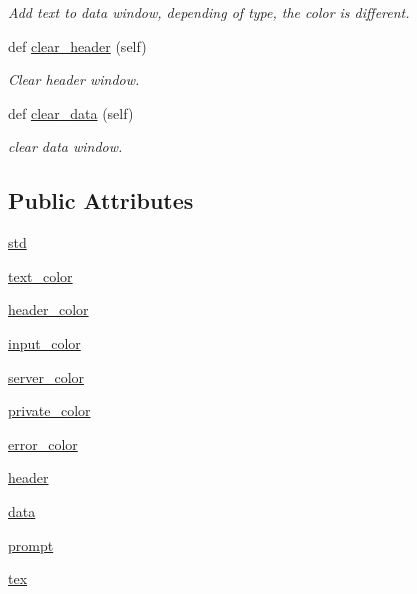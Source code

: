 \begin{DoxyCompactItemize}
\begin{DoxyCompactList}\small\item\em Add text to data window, depending of type, the color is different. \end{DoxyCompactList}\item 
def \hyperlink{classlib_1_1window_1_1_window_a6b69f59f1e8e67522985a37b34aab6e3}{clear\+\_\+header} (self)
\begin{DoxyCompactList}\small\item\em Clear header window. \end{DoxyCompactList}\item 
def \hyperlink{classlib_1_1window_1_1_window_a48311c44458288f29ec758cffa93f801}{clear\+\_\+data} (self)
\begin{DoxyCompactList}\small\item\em clear data window. \end{DoxyCompactList}\end{DoxyCompactItemize}
\subsection*{Public Attributes}
\begin{DoxyCompactItemize}
\item 
\hyperlink{classlib_1_1window_1_1_window_a9b20669f15ee40985bd201e54984bf7f}{std}
\item 
\hyperlink{classlib_1_1window_1_1_window_afccc6790aaab20faf9c796f229f6a4b1}{text\+\_\+color}
\item 
\hyperlink{classlib_1_1window_1_1_window_ad231d19f8aad80c6db88f99956dc50ac}{header\+\_\+color}
\item 
\hyperlink{classlib_1_1window_1_1_window_a23b8ad80913c9c9f14d42d3f89523207}{input\+\_\+color}
\item 
\hyperlink{classlib_1_1window_1_1_window_abd0c48e37370c0f7cbd451918febada7}{server\+\_\+color}
\item 
\hyperlink{classlib_1_1window_1_1_window_a5bdf660bc0b8a07cb9b8cf0d2f3e7623}{private\+\_\+color}
\item 
\hyperlink{classlib_1_1window_1_1_window_ab54668afdb1ccfa2254ee87a05a75ff0}{error\+\_\+color}
\item 
\hyperlink{classlib_1_1window_1_1_window_a5f6d8dd04b33823324ca124b7325c30e}{header}
\item 
\hyperlink{classlib_1_1window_1_1_window_a00641db04214b59c03f9b8801aa95950}{data}
\item 
\hyperlink{classlib_1_1window_1_1_window_af5f5e6043dbcefb2744db2ea1afe7b54}{prompt}
\item 
\hyperlink{classlib_1_1window_1_1_window_abab7f0c56567d8300daf6082907b122a}{tex}
\end{DoxyCompactItemize}


